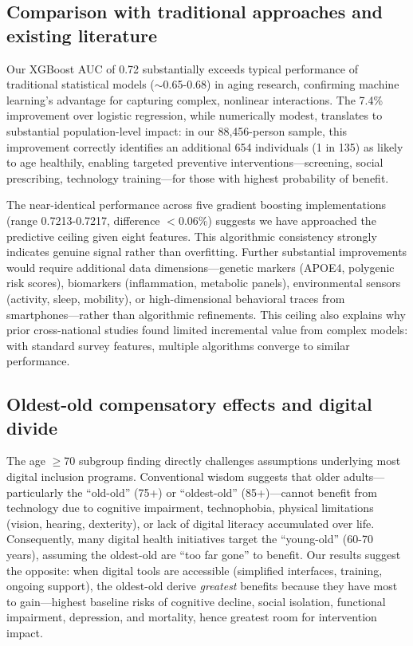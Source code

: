 \documentclass[10pt]{article}
\begin{document}
\subsection*{Comparison with traditional approaches and existing literature}

Our XGBoost AUC of 0.72 substantially exceeds typical performance of traditional statistical models ($\sim$0.65-0.68) in aging research, confirming machine learning's advantage for capturing complex, nonlinear interactions. The 7.4\% improvement over logistic regression, while numerically modest, translates to substantial population-level impact: in our 88,456-person sample, this improvement correctly identifies an additional 654 individuals (1 in 135) as likely to age healthily, enabling targeted preventive interventions---screening, social prescribing, technology training---for those with highest probability of benefit.

The near-identical performance across five gradient boosting implementations (range 0.7213-0.7217, difference $<$0.06\%) suggests we have approached the predictive ceiling given eight features. This algorithmic consistency strongly indicates genuine signal rather than overfitting. Further substantial improvements would require additional data dimensions---genetic markers (APOE4, polygenic risk scores), biomarkers (inflammation, metabolic panels), environmental sensors (activity, sleep, mobility), or high-dimensional behavioral traces from smartphones---rather than algorithmic refinements. This ceiling also explains why prior cross-national studies found limited incremental value from complex models: with standard survey features, multiple algorithms converge to similar performance.

\subsection*{Oldest-old compensatory effects and digital divide}

The age $\geq$70 subgroup finding directly challenges assumptions underlying most digital inclusion programs. Conventional wisdom suggests that older adults---particularly the ``old-old'' (75+) or ``oldest-old'' (85+)---cannot benefit from technology due to cognitive impairment, technophobia, physical limitations (vision, hearing, dexterity), or lack of digital literacy accumulated over life. Consequently, many digital health initiatives target the ``young-old'' (60-70 years), assuming the oldest-old are ``too far gone'' to benefit. Our results suggest the opposite: when digital tools are accessible (simplified interfaces, training, ongoing support), the oldest-old derive \textit{greatest} benefits because they have most to gain---highest baseline risks of cognitive decline, social isolation, functional impairment, depression, and mortality, hence greatest room for intervention impact.
\end{document}
